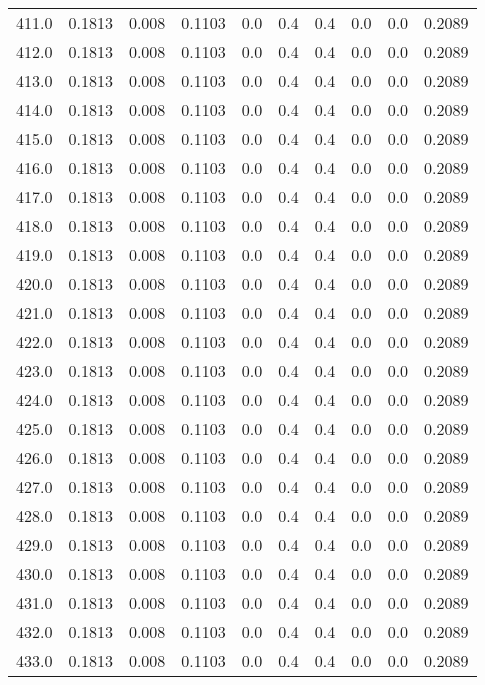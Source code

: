 \begin{longtable}{lrrrrrrrrr}
411.0 & 0.1813 & 0.008 & 0.1103 & 0.0 & 0.4 & 0.4 & 0.0 & 0.0 & 0.2089 \\
412.0 & 0.1813 & 0.008 & 0.1103 & 0.0 & 0.4 & 0.4 & 0.0 & 0.0 & 0.2089 \\
413.0 & 0.1813 & 0.008 & 0.1103 & 0.0 & 0.4 & 0.4 & 0.0 & 0.0 & 0.2089 \\
414.0 & 0.1813 & 0.008 & 0.1103 & 0.0 & 0.4 & 0.4 & 0.0 & 0.0 & 0.2089 \\
415.0 & 0.1813 & 0.008 & 0.1103 & 0.0 & 0.4 & 0.4 & 0.0 & 0.0 & 0.2089 \\
416.0 & 0.1813 & 0.008 & 0.1103 & 0.0 & 0.4 & 0.4 & 0.0 & 0.0 & 0.2089 \\
417.0 & 0.1813 & 0.008 & 0.1103 & 0.0 & 0.4 & 0.4 & 0.0 & 0.0 & 0.2089 \\
418.0 & 0.1813 & 0.008 & 0.1103 & 0.0 & 0.4 & 0.4 & 0.0 & 0.0 & 0.2089 \\
419.0 & 0.1813 & 0.008 & 0.1103 & 0.0 & 0.4 & 0.4 & 0.0 & 0.0 & 0.2089 \\
420.0 & 0.1813 & 0.008 & 0.1103 & 0.0 & 0.4 & 0.4 & 0.0 & 0.0 & 0.2089 \\
421.0 & 0.1813 & 0.008 & 0.1103 & 0.0 & 0.4 & 0.4 & 0.0 & 0.0 & 0.2089 \\
422.0 & 0.1813 & 0.008 & 0.1103 & 0.0 & 0.4 & 0.4 & 0.0 & 0.0 & 0.2089 \\
423.0 & 0.1813 & 0.008 & 0.1103 & 0.0 & 0.4 & 0.4 & 0.0 & 0.0 & 0.2089 \\
424.0 & 0.1813 & 0.008 & 0.1103 & 0.0 & 0.4 & 0.4 & 0.0 & 0.0 & 0.2089 \\
425.0 & 0.1813 & 0.008 & 0.1103 & 0.0 & 0.4 & 0.4 & 0.0 & 0.0 & 0.2089 \\
426.0 & 0.1813 & 0.008 & 0.1103 & 0.0 & 0.4 & 0.4 & 0.0 & 0.0 & 0.2089 \\
427.0 & 0.1813 & 0.008 & 0.1103 & 0.0 & 0.4 & 0.4 & 0.0 & 0.0 & 0.2089 \\
428.0 & 0.1813 & 0.008 & 0.1103 & 0.0 & 0.4 & 0.4 & 0.0 & 0.0 & 0.2089 \\
429.0 & 0.1813 & 0.008 & 0.1103 & 0.0 & 0.4 & 0.4 & 0.0 & 0.0 & 0.2089 \\
430.0 & 0.1813 & 0.008 & 0.1103 & 0.0 & 0.4 & 0.4 & 0.0 & 0.0 & 0.2089 \\
431.0 & 0.1813 & 0.008 & 0.1103 & 0.0 & 0.4 & 0.4 & 0.0 & 0.0 & 0.2089 \\
432.0 & 0.1813 & 0.008 & 0.1103 & 0.0 & 0.4 & 0.4 & 0.0 & 0.0 & 0.2089 \\
433.0 & 0.1813 & 0.008 & 0.1103 & 0.0 & 0.4 & 0.4 & 0.0 & 0.0 & 0.2089 \\

\end{longtable}
